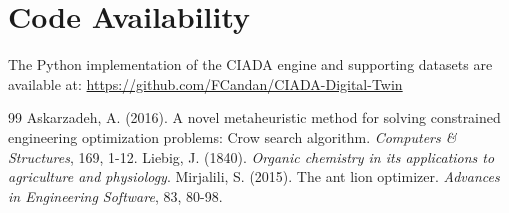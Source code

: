 \documentclass[twocolumn, 10pt]{article}
\begin{document}
\section*{Code Availability}
The Python implementation of the CIADA engine and supporting datasets are available at: \url{https://github.com/FCandan/CIADA-Digital-Twin}

\begin{thebibliography}{99}
 Askarzadeh, A. (2016). A novel metaheuristic method for solving constrained engineering optimization problems: Crow search algorithm. \textit{Computers \& Structures}, 169, 1-12.
 Liebig, J. (1840). \textit{Organic chemistry in its applications to agriculture and physiology}.
 Mirjalili, S. (2015). The ant lion optimizer. \textit{Advances in Engineering Software}, 83, 80-98.
\end{thebibliography}
\end{document}
